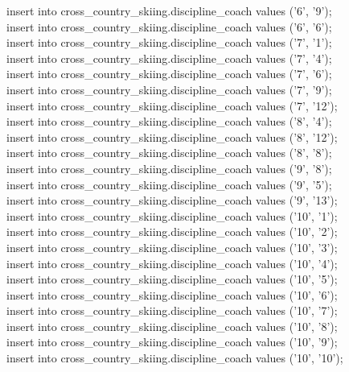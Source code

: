 \documentclass[a4paper,12pt]{article}
\begin{document}
insert into cross\_country\_skiing.discipline\_coach values ('6', '9');\\
insert into cross\_country\_skiing.discipline\_coach values ('6', '6');\\
insert into cross\_country\_skiing.discipline\_coach values ('7', '1');\\
insert into cross\_country\_skiing.discipline\_coach values ('7', '4');\\
insert into cross\_country\_skiing.discipline\_coach values ('7', '6');\\
insert into cross\_country\_skiing.discipline\_coach values ('7', '9');\\
insert into cross\_country\_skiing.discipline\_coach values ('7', '12');\\
insert into cross\_country\_skiing.discipline\_coach values ('8', '4');\\
insert into cross\_country\_skiing.discipline\_coach values ('8', '12');\\
insert into cross\_country\_skiing.discipline\_coach values ('8', '8');\\
insert into cross\_country\_skiing.discipline\_coach values ('9', '8');\\
insert into cross\_country\_skiing.discipline\_coach values ('9', '5');\\
insert into cross\_country\_skiing.discipline\_coach values ('9', '13');\\
insert into cross\_country\_skiing.discipline\_coach values ('10',  '1');\\
insert into cross\_country\_skiing.discipline\_coach values ('10',  '2');\\
insert into cross\_country\_skiing.discipline\_coach values ('10',  '3');\\
insert into cross\_country\_skiing.discipline\_coach values ('10',  '4');\\
insert into cross\_country\_skiing.discipline\_coach values ('10',  '5');\\
insert into cross\_country\_skiing.discipline\_coach values ('10',  '6');\\
insert into cross\_country\_skiing.discipline\_coach values ('10',  '7');\\
insert into cross\_country\_skiing.discipline\_coach values ('10',  '8');\\
insert into cross\_country\_skiing.discipline\_coach values ('10',  '9');\\
insert into cross\_country\_skiing.discipline\_coach values ('10',  '10');\\
\end{document}
